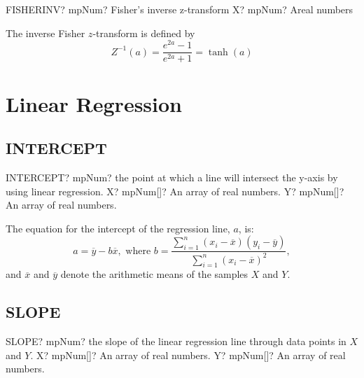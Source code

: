 \begin{mpFunctionsExtract}
	\mpWorksheetFunctionOneNotImplemented
	{FISHERINV? mpNum? Fisher's inverse z-transform}
	{X? mpNum? Areal numbers}
\end{mpFunctionsExtract}


The inverse Fisher $z$-transform is defined by
\begin{equation} 
	Z^{-1}(a) = \frac{e^{2a}-1}{e^{2a}+1} = \tanh(a)
\end{equation}




\newpage
\section{Linear Regression}

\subsection{INTERCEPT}

\begin{mpFunctionsExtract}
	\mpWorksheetFunctionTwoNotImplemented
	{INTERCEPT? mpNum? the point at which a line will intersect the y-axis by using linear regression.}
	{X? mpNum[]? An array of real numbers.}
	{Y? mpNum[]? An array of real numbers.}
\end{mpFunctionsExtract}


\vspace{0.3cm}
The equation for the intercept of the regression line, $a$, is: 
\begin{equation}
	a= \overline{y} - b \overline{x},  \text{ where }  b = \frac{\sum_{i=1}^n (x_i-\overline{x})(y_i-\overline{y})}{\sum_{i=1}^n (x_i-\overline{x})^2},
\end{equation}
and $\overline{x}$ and $\overline{y}$ denote the arithmetic means of the samples $X$ and $Y$.



\subsection{SLOPE}

\begin{mpFunctionsExtract}
	\mpWorksheetFunctionTwoNotImplemented
	{SLOPE? mpNum? the slope of the linear regression line through data points in $X$ and $Y$.}
	{X? mpNum[]? An array of real numbers.}
	{Y? mpNum[]? An array of real numbers.}
\end{mpFunctionsExtract}

